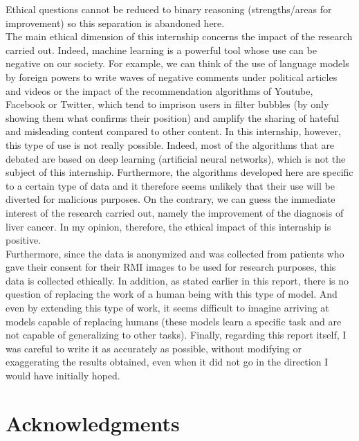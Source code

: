 \documentclass[preprint,12pt]{elsarticle}
\begin{document}
\noindent Ethical questions cannot be reduced to binary reasoning (strengths/areas for improvement) so this separation is abandoned here.\\
\indent The main ethical dimension of this internship concerns the impact of the research carried out. Indeed, machine learning is a powerful tool whose use can be negative on our society. For example, we can think of the use of language models by foreign powers to write waves of negative comments under political articles and videos or the impact of the recommendation algorithms of Youtube, Facebook or Twitter, which tend to imprison users in filter bubbles (by only showing them what confirms their position) and amplify the sharing of hateful and misleading content compared to other content. In this internship, however, this type of use is not really possible. Indeed, most of the algorithms that are debated are based on deep learning (artificial neural networks), which is not the subject of this internship. Furthermore, the algorithms developed here are specific to a certain type of data and it therefore seems unlikely that their use will be diverted for malicious purposes. On the contrary, we can guess the immediate interest of the research carried out, namely the improvement of the diagnosis of liver cancer. In my opinion, therefore, the ethical impact of this internship is positive.\\
\indent Furthermore, since the data is anonymized and was collected from patients who gave their consent for their RMI images to be used for research purposes, this data is collected ethically. In addition, as stated earlier in this report, there is no question of replacing the work of a human being with this type of model. And even by extending this type of work, it seems difficult to imagine arriving at models capable of replacing humans (these models learn a specific task and are not capable of generalizing to other tasks). Finally, regarding this report itself, I was careful to write it as accurately as possible, without modifying or exaggerating the results obtained, even when it did not go in the direction I would have initially hoped.

\newpage

\section{Acknowledgments}
\end{document}
